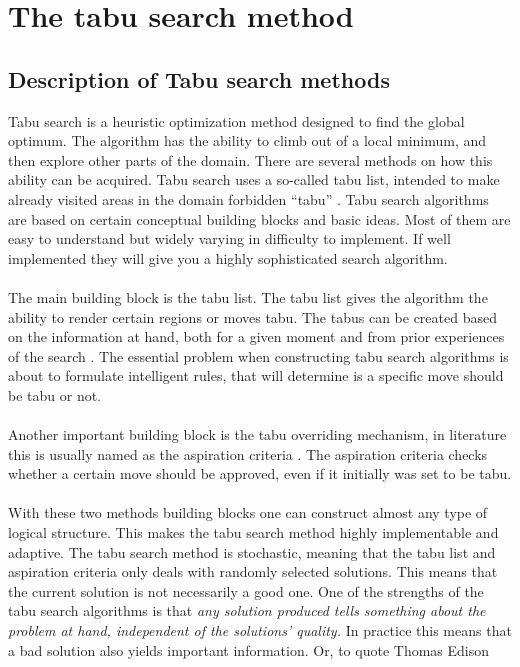 \pagebreak
\section{The tabu search method}
\subsection{Description of Tabu search methods}
Tabu search is a heuristic optimization method designed to find the global optimum. The algorithm has the ability to climb out of a local minimum, and then explore other parts of the domain. There are several methods on how this ability can be acquired. Tabu search uses a so-called tabu list, intended to make already visited areas in the domain forbidden ``tabu'' \cite{Glover1} \cite{Glover3} \cite{Glover4}. Tabu search algorithms are based on certain conceptual building blocks and basic ideas. Most of them are easy to understand but widely varying in difficulty to implement. If well implemented they will give you a highly sophisticated search algorithm. \\
\\The main building block is the tabu list. The tabu list gives the algorithm the ability to render certain regions or moves tabu. The tabus can be created based on the information at hand, both for a given moment and from prior experiences of the search \cite{canada}. The essential problem when constructing tabu search algorithms is about to formulate intelligent rules, that will determine is a specific move should be tabu or not.\\
\\Another important building block is the tabu overriding mechanism, in literature this is usually named as the aspiration criteria \cite{canada} \cite{Glover2}. The aspiration criteria checks whether a certain move should be approved, even if it initially was set to be tabu. \\
\\With these two methods building blocks one can construct almost any type of logical structure. This makes the tabu search method highly implementable and adaptive. The tabu search method is stochastic, meaning that the tabu list and aspiration criteria only deals with randomly selected solutions. This means that the current solution is not necessarily a good one. One of the strengths of the tabu search algorithms is that \emph{any solution produced tells something about the problem at hand, independent of the solutions' quality.} In practice this means that a bad solution also yields important information.  Or, to quote Thomas Edison 
